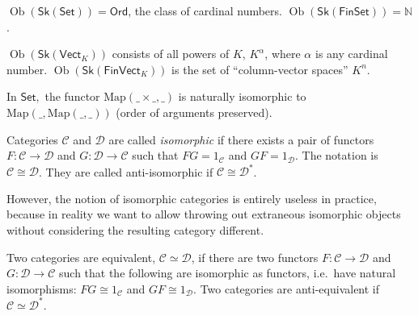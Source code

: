 \documentclass[english,letterpaper]{article}%
\numberwithin{equation}{section}
\numberwithin{figure}{section}
\numberwithin{table}{section}
\theoremstyle{definition}
\theoremstyle{definition}
\theoremstyle{definition}
\theoremstyle{plain}
\theoremstyle{plain}
\theoremstyle{plain}
\theoremstyle{plain}
\theoremstyle{remark}
\theoremstyle{remark}
\DeclareMathOperator{\ob}{Ob}
\begin{document}
\begin{example}
$\ob\left(\mathsf{Sk}\left(\mathsf{Set}\right)\right)=\mathsf{Ord}$,
the class of cardinal numbers. $\ob\left(\mathsf{Sk}\left(\mathsf{FinSet}\right)\right)=\mathbb{N}$. 
\end{example}
%
\begin{example}
$\ob\left(\mathsf{Sk}\left(\mathsf{Vect}_{K}\right)\right)$ consists
of all powers of $K$, $K^{\alpha}$, where $\alpha$ is any cardinal
number. $\ob\left(\mathsf{Sk}\left(\mathsf{FinVect}_{K}\right)\right)$
is the set of ``column-vector spaces'' $K^{n}$.
\end{example}
%
\begin{example}
In $\mathsf{Set},$ the functor $\mathrm{Map}\left(\_\times\_,\_\right)$
is naturally isomorphic to $\mathrm{Map}\left(\_,\mathrm{Map}\left(\_,\_\right)\right)$
(order of arguments preserved).
\end{example}
\begin{defn}
Categories $\mathcal{C}$ and $\mathcal{D}$ are called \emph{isomorphic}
if there exists a pair of functors $F:\mathcal{C}\to\mathcal{D}$
and $G:\mathcal{D}\to\mathcal{C}$ such that $FG=1_{\mathcal{C}}$
and $GF=1_{\mathcal{D}}$. The notation is $\mathcal{C}\cong\mathcal{D}$.
They are called anti-isomorphic if $\mathcal{C}\cong\mathcal{D}^{\ast}$.
\end{defn}
However, the notion of isomorphic categories is entirely useless in
practice, because in reality we want to allow throwing out extraneous
isomorphic objects without considering the resulting category different.
\begin{defn}
 Two categories are equivalent, $\mathcal{C}\simeq\mathcal{D}$,
if there are two functors $F:\mathcal{C}\to\mathcal{D}$ and $G:\mathcal{D}\to\mathcal{C}$
such that the following are isomorphic as functors, i.e.\ have natural
isomorphisms: $FG\cong1_{\mathcal{C}}$ and $GF\cong1_{\mathcal{D}}$.
Two categories are anti-equivalent if $\mathcal{C}\simeq\mathcal{D}^{\ast}$.
\end{defn}
%
\end{document}
